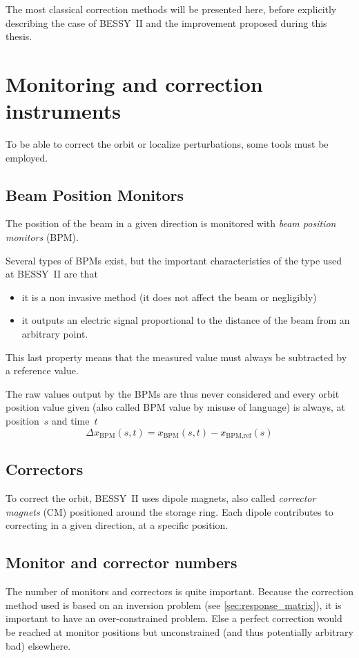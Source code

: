 The most classical correction methods will be presented here, before explicitly describing the case of BESSY~II and the improvement proposed during this thesis.

\section{Monitoring and correction instruments}
To be able to correct the orbit or localize perturbations, some tools must be employed.

\subsection{Beam Position Monitors}
The position of the beam in a given direction is monitored with \emph{beam position monitors} (BPM).

Several types of BPMs exist, but the important characteristics of the type used at BESSY~II are that
\begin{itemize}
	\item it is a non invasive method (it does not affect the beam or negligibly)
	\item it outputs an electric signal proportional to the distance of the beam from an arbitrary point.
\end{itemize}

This last property means that the measured value must always be subtracted by a reference value.

The raw values output by the BPMs are thus never considered and every orbit position value given (also called BPM value by misuse of language) is always, at position~$s$ and time~$t$
\begin{equation}
\Delta x_\text{BPM}(s,t) = x_\text{BPM}(s,t) - x_\text{BPM,ref}(s)
\end{equation}

\subsection{Correctors}
To correct the orbit, BESSY~II uses dipole magnets, also called \emph{corrector magnets} (CM) positioned around the storage ring. Each dipole contributes to correcting in a given direction, at a specific position.

\subsection{Monitor and corrector numbers}
The number of monitors and correctors is quite important. Because the correction method used is based on an inversion problem (see \cref{sec:response_matrix}), it is important to have an over-constrained problem. Else a perfect correction would be reached at monitor positions but unconstrained (and thus potentially arbitrary bad) elsewhere.

